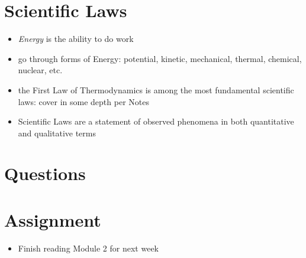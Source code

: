\documentclass[10pt, oneside]{article}   	%
\begin{document}
\section*{Scientific Laws}
\begin{itemize}
\item \emph{Energy} is the ability to do work
\item go through forms of Energy: potential, kinetic, mechanical, thermal, chemical, nuclear, etc.
\item the First Law of Thermodynamics is among the most fundamental scientific laws: cover in some depth per Notes
\item Scientific Laws are a statement of observed phenomena in both quantitative and qualitative terms
\end{itemize}

\section*{Questions}

\section*{Assignment}
\begin{itemize}
\item Finish reading Module 2 for next week
\end{itemize}
\end{document}
